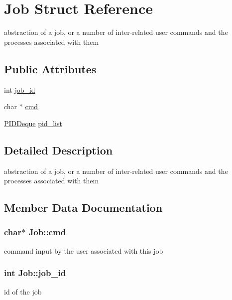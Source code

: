 \hypertarget{structJob}{}\section{Job Struct Reference}
\label{structJob}


abstraction of a job, or a number of inter-\/related user commands and the processes associated with them  


\subsection*{Public Attributes}
\begin{DoxyCompactItemize}
\item 
int \hyperlink{structJob_ab154568a2319db1e0cf6296872e6a398}{job\+\_\+id}
\item 
char $\ast$ \hyperlink{structJob_aef40af5b52f92ed8019f5db2b5dff77b}{cmd}
\item 
\hyperlink{structPIDDeque}{P\+I\+D\+Deque} \hyperlink{structJob_a4b8bd098708882614988176270f69e10}{pid\+\_\+list}
\end{DoxyCompactItemize}


\subsection{Detailed Description}
abstraction of a job, or a number of inter-\/related user commands and the processes associated with them 

\subsection{Member Data Documentation}
\subsubsection[{\texorpdfstring{cmd}{cmd}}]{\setlength{\rightskip}{0pt plus 5cm}char$\ast$ Job\+::cmd}\hypertarget{structJob_aef40af5b52f92ed8019f5db2b5dff77b}{}\label{structJob_aef40af5b52f92ed8019f5db2b5dff77b}
command input by the user associated with this job 
\subsubsection[{\texorpdfstring{job\+\_\+id}{job_id}}]{\setlength{\rightskip}{0pt plus 5cm}int Job\+::job\+\_\+id}\hypertarget{structJob_ab154568a2319db1e0cf6296872e6a398}{}\label{structJob_ab154568a2319db1e0cf6296872e6a398}
id of the job 
